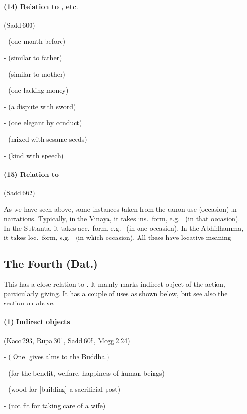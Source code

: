 \paragraph*{(14) Relation to , etc.} (Sadd\,600)\par
-  (one month before)\par
-  (similar to father)\par
-  (similar to mother)\par
-  (one lacking money)\par
-  (a dispute with sword)\par
-  (one elegant by conduct)\par
-  (mixed with sesame seeds)\par
-  (kind with speech)\par

\paragraph*{(15) Relation to } (Sadd\,662)\par
As we have seen above, some instances taken from the canon use  (occasion) in narrations. Typically, in the Vinaya, it takes ins.\ form, e.g.\  (in that occasion). In the Suttanta, it takes acc.\ form, e.g.\  (in one occasion). In the Abhidhamma, it takes loc.\ form, e.g.\  (in which occasion). All these have locative meaning.

{}
\subsection*{The Fourth  (Dat.)}

This  has a close relation to . It mainly marks indirect object of the action, particularly giving. It has a couple of uses as shown below, but see also the section on  above.

\paragraph*{(1) Indirect objects} (Kacc\,293, R\=upa\,301, Sadd\,605, Mogg\,2.24)\par
-  ([One] gives alms to the Buddha.)\par
-  (for the benefit, welfare, happiness of human beings)\par
-  (wood for [building] a sacrificial post)\par
-  (not fit for taking care of a wife)\par

